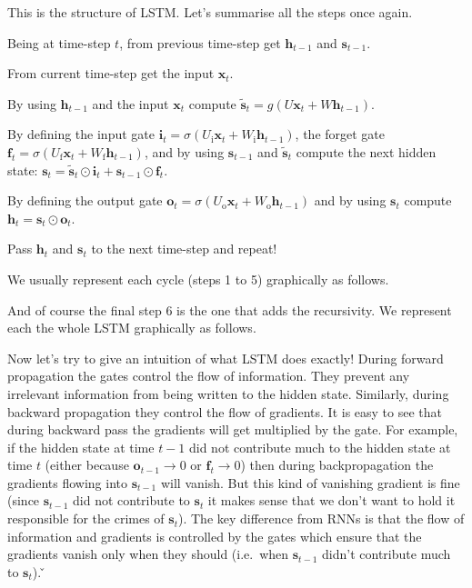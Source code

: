 This is the structure of LSTM. Let's summarise all the steps once again.
\ben
\item Being at time-step $t$, from previous time-step get $\boldsymbol{h}_{t-1}$ and $\boldsymbol{s}_{t-1}$.
\item From current time-step get the input $\boldsymbol{x}_{t}$.
\item By using $\boldsymbol{h}_{t-1}$ and the input $\boldsymbol{x}_{t}$ compute $\boldsymbol{\tilde{s}}_t = g
(U\boldsymbol{x}_t + W \boldsymbol{h}_{t-1})$.
\item By defining the input gate $\boldsymbol{i}_{t} = \sigma(U_{\text{i}} \boldsymbol{x}_{t} + W_{\text{i}}
\boldsymbol{h}_{t-1})$, the forget gate $\boldsymbol{f}_{t} = \sigma (U_{\text{f}} \boldsymbol{x}_{t} +
W_{\text{f}} \boldsymbol{h}_{t-1})$, and by using $\boldsymbol{s}_{t-1}$ and $\boldsymbol{\tilde{s}}_t$ compute the
next hidden state: $\boldsymbol{s}_{t} =\boldsymbol{\tilde{s}}_t\odot \boldsymbol{i}_{t} + \boldsymbol{s}_{t-1} \odot
\boldsymbol{f}_{t}$.
\item By defining the output gate $\boldsymbol{o}_{t} = \sigma (U_{\text{o}} \boldsymbol{x}_{t} + W_{\text{o}}
\boldsymbol{h}_{t-1})$ and by using $\boldsymbol{s}_{t}$ compute $\boldsymbol{h}_{t} = \boldsymbol{s}_{t} \odot
\boldsymbol{o}_{t}$.
\item Pass $\boldsymbol{h}_{t}$ and $\boldsymbol{s}_{t}$ to the next time-step and repeat!
\een

We usually represent each cycle (steps 1 to 5) graphically as follows.


And of course the final step 6 is the one that adds the recursivity. We represent each the whole LSTM graphically as
follows.


Now let's try to give an intuition of what LSTM does exactly! During forward propagation the gates control the flow
of information. They prevent any irrelevant information from being written to the hidden state. Similarly, during backward
propagation they control the flow of gradients. It is easy to see that during backward pass the gradients will get
multiplied by the gate. For example, if the hidden state at time $t - 1$ did not contribute much to the hidden state at time $t$
(either because $\boldsymbol{o}_{t-1} \to 0$ or $\boldsymbol{f}_{t} \to 0$) then during backpropagation the gradients
flowing into $\boldsymbol{s}_{t-1}$ will vanish. But this kind of vanishing gradient is fine (since
$\boldsymbol{s}_{t-1}$ did not contribute to $\boldsymbol{s}_{t}$ it makes sense that we don't want to hold it
responsible for the crimes of $\boldsymbol{s}_{t}$). The key difference from RNNs is that the flow of information and
gradients is controlled by the gates which ensure that the gradients vanish only when they should (i.e.\ when
$\boldsymbol{s}_{t-1}$ didn't contribute much to $\boldsymbol{s}_{t}$). \v

